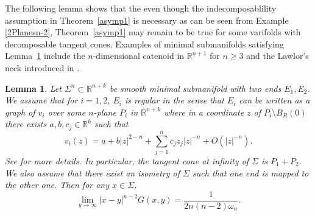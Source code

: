 \documentclass[11pt]{amsart}
\newtheorem{lemma}[theorem]{Lemma}
\theoremstyle{definition}
\newcommand{\R}{\mathbb{R}}
\begin{document}
The following lemma shows that the even though the indecomposablility assumption in Theorem~\ref{asymp1} is necessary as can be seen from Example \ref{2Planesn-2}, Theorem~\ref{asymp1} may remain to be true for some varifolds with decomposable tangent cones. Examples of minimal submanifolds satisfying Lemma~\ref{regular.at.infinity.2.planes} include the $n$-dimensional catenoid in $\R^{n+1}$ for $n\ge 3$ and the Lawlor's neck introduced in \cite{La}.
\begin{lemma}\label{regular.at.infinity.2.planes}
Let $\Sigma^n\subset \R^{n+k}$ be smooth minimal submanifold with two ends $E_1,E_2$. We assume that for $i=1,2$, $E_i$ is regular in the sense that $E_i$ can be written as a graph of $v_i$ over some $n$-plane $P_i$ in $\R^{n+k}$ where in a coordinate $z$ of $P_i\setminus B_R(0)$ there exists $a,b,c_j\in \R^k$ such that \[v_i(z)=a+b|z|^{2-n}+\sum_{j=1}^nc_jz_j|z|^{-n}+O(|z|^{-n}).\] See \cite[Definition, page 800]{Sch83} for more details. In particular, the tangent cone at infinity of $\Sigma$  is $P_1+ P_2$. We also assume that there exist an isometry of $\Sigma$  such that one end is mapped to the other one.   Then for any  $x\in\Sigma $, \[\lim_{y\to\infty}|x-y|^{n-2}G(x,y)=\frac{1}{2n(n-2)\omega_n}.\] 
\end{lemma}
\end{document}
